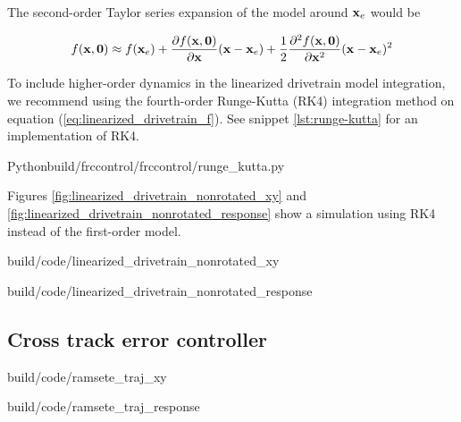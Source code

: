The second-order Taylor series expansion of the \gls{model} around $\mathbf{x}_e$
would be

\begin{equation*}
  f(\mathbf{x}, \mathbf{0}) \approx f(\mathbf{x}_e) +
    \frac{\partial f(\mathbf{x}, \mathbf{0})}{\partial\mathbf{x}}(\mathbf{x} - \mathbf{x}_e) +
    \frac{1}{2}\frac{\partial^2 f(\mathbf{x}, \mathbf{0})}{\partial\mathbf{x}^2}
    (\mathbf{x} - \mathbf{x}_e)^2
\end{equation*}

To include higher-order dynamics in the linearized drivetrain model integration,
we recommend using the fourth-order Runge-Kutta (RK4) integration method on
equation (\ref{eq:linearized_drivetrain_f}). See snippet \ref{lst:runge-kutta}
for an implementation of RK4.

\begin{code}{Python}{build/frccontrol/frccontrol/runge_kutta.py}
  \caption{Fourth-order Runge-Kutta integration in Python}
  \label{lst:runge-kutta}
\end{code}

Figures \ref{fig:linearized_drivetrain_nonrotated_xy} and
\ref{fig:linearized_drivetrain_nonrotated_response} show a simulation using RK4
instead of the first-order \gls{model}.

\begin{bookfigure}
  \begin{minisvg}{build/code/linearized_drivetrain_nonrotated_xy}
    \caption{Linearized drivetrain controller (global reference frame
      formulation) x-y plot}
    \label{fig:linearized_drivetrain_nonrotated_xy}
  \end{minisvg}
  \hfill
  \begin{minisvg}{build/code/linearized_drivetrain_nonrotated_response}
    \caption{Linearized drivetrain controller (global reference frame
      formulation) response}
    \label{fig:linearized_drivetrain_nonrotated_response}
  \end{minisvg}
\end{bookfigure}

\subsection{Cross track error controller}

\begin{bookfigure}
  \begin{minisvg}{build/code/ramsete_traj_xy}
    \caption{Ramsete nonlinear controller x-y plot}
    \label{fig:ramsete_traj_xy2}
  \end{minisvg}
  \hfill
  \begin{minisvg}{build/code/ramsete_traj_response}
    \caption{Ramsete nonlinear controller response}
    \label{fig:ramsete_traj_response2}
  \end{minisvg}
\end{bookfigure}


